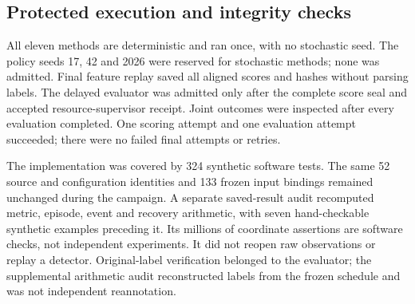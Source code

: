 \subsection{Protected execution and integrity checks}
All eleven methods are deterministic and ran once, with no stochastic seed. The policy seeds 17, 42 and 2026 were reserved for stochastic methods; none was admitted. Final feature replay saved all aligned scores and hashes without parsing labels. The delayed evaluator was admitted only after the complete score seal and accepted resource-supervisor receipt. Joint outcomes were inspected after every evaluation completed. One scoring attempt and one evaluation attempt succeeded; there were no failed final attempts or retries.

The implementation was covered by 324 synthetic software tests. The same 52 source and configuration identities and 133 frozen input bindings remained unchanged during the campaign. A separate saved-result audit recomputed metric, episode, event and recovery arithmetic, with seven hand-checkable synthetic examples preceding it. Its millions of coordinate assertions are software checks, not independent experiments. It did not reopen raw observations or replay a detector. Original-label verification belonged to the evaluator; the supplemental arithmetic audit reconstructed labels from the frozen schedule and was not independent reannotation.
